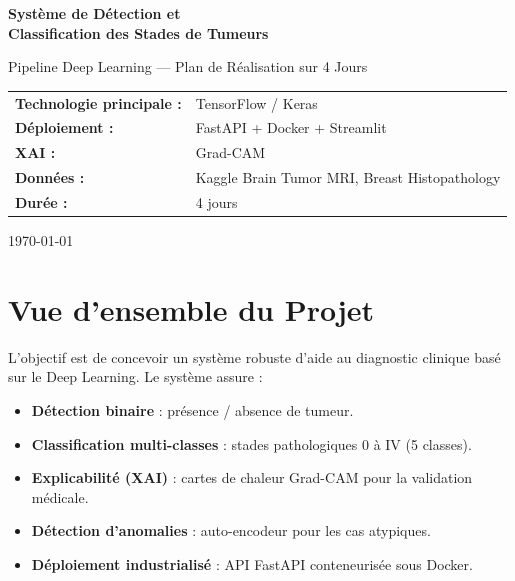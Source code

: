 \documentclass[12pt,a4paper]{article}
\begin{document}
\begin{titlepage}
  \centering
  \vspace*{2cm}
  {\Huge\bfseries\color{primaryBlue} Système de Détection et \\ Classification des Stades de Tumeurs\par}
  \vspace{0.5cm}
  {\Large\color{darkGray} Pipeline Deep Learning — Plan de Réalisation sur 4 Jours\par}
  \vspace{1.5cm}
  \vspace{1.5cm}

  \begin{tabular}{ll}
    \textbf{Technologie principale :} & TensorFlow / Keras \\
    \textbf{Déploiement :}            & FastAPI + Docker + Streamlit \\
    \textbf{XAI :}                    & Grad-CAM \\
    \textbf{Données :}                & Kaggle Brain Tumor MRI, Breast Histopathology \\
    \textbf{Durée :}                  & 4 jours \\
  \end{tabular}

  \vfill
  {\large\color{darkGray} \today}
\end{titlepage}

\tableofcontents
\newpage

\section{Vue d'ensemble du Projet}

L'objectif est de concevoir un système robuste d'aide au diagnostic clinique basé sur le Deep Learning. Le système assure :

\begin{itemize}[leftmargin=1.5cm]
  \item \textbf{Détection binaire} : présence / absence de tumeur.
  \item \textbf{Classification multi-classes} : stades pathologiques 0 à IV (5 classes).
  \item \textbf{Explicabilité (XAI)} : cartes de chaleur Grad-CAM pour la validation médicale.
  \item \textbf{Détection d'anomalies} : auto-encodeur pour les cas atypiques.
  \item \textbf{Déploiement industrialisé} : API FastAPI conteneurisée sous Docker.
\end{itemize}
\end{document}
